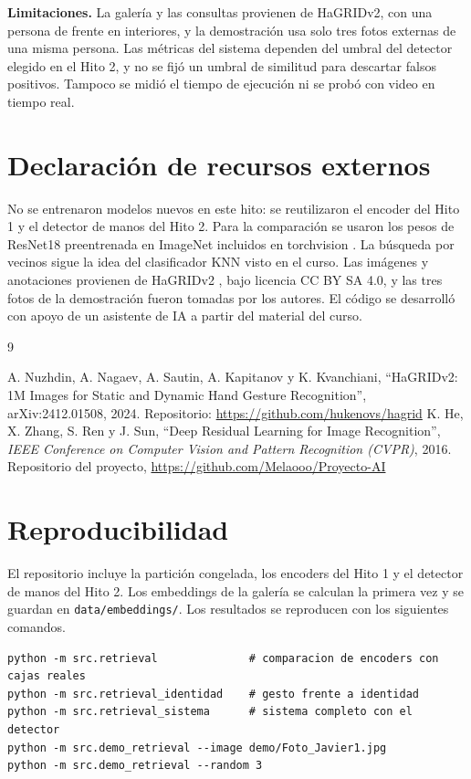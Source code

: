 \documentclass[11pt,letterpaper]{article}
\begin{document}
\textbf{Limitaciones.} La galería y las consultas provienen de HaGRIDv2, con una persona de frente en
interiores, y la demostración usa solo tres fotos externas de una misma persona. Las métricas del
sistema dependen del umbral del detector elegido en el Hito 2, y no se fijó un umbral de similitud
para descartar falsos positivos. Tampoco se midió el tiempo de ejecución ni se probó con video en
tiempo real.

\section*{Declaración de recursos externos}

No se entrenaron modelos nuevos en este hito: se reutilizaron el encoder del Hito 1 y el detector de
manos del Hito 2. Para la comparación se usaron los pesos de ResNet18 preentrenada en ImageNet
incluidos en torchvision \cite{he2016}. La búsqueda por vecinos sigue la idea del clasificador KNN
visto en el curso. Las imágenes y anotaciones provienen de HaGRIDv2 \cite{hagridv2}, bajo licencia
CC BY SA 4.0, y las tres fotos de la demostración fueron tomadas por los autores. El código se
desarrolló con apoyo de un asistente de IA a partir del material del curso.

\begin{thebibliography}{9}
 A. Nuzhdin, A. Nagaev, A. Sautin, A. Kapitanov y K. Kvanchiani, ``HaGRIDv2: 1M Images for
Static and Dynamic Hand Gesture Recognition'', arXiv:2412.01508, 2024. Repositorio:
\url{https://github.com/hukenovs/hagrid}
 K. He, X. Zhang, S. Ren y J. Sun, ``Deep Residual Learning for Image Recognition'',
\emph{IEEE Conference on Computer Vision and Pattern Recognition (CVPR)}, 2016.
 Repositorio del proyecto, \url{https://github.com/Melaooo/Proyecto-AI}
\end{thebibliography}

\newpage
\appendix
\section{Reproducibilidad}

El repositorio \cite{repo} incluye la partición congelada, los encoders del Hito 1 y el detector de
manos del Hito 2. Los embeddings de la galería se calculan la primera vez y se guardan en
\texttt{data/embeddings/}. Los resultados se reproducen con los siguientes comandos.

\begin{lstlisting}
python -m src.retrieval              # comparacion de encoders con cajas reales
python -m src.retrieval_identidad    # gesto frente a identidad
python -m src.retrieval_sistema      # sistema completo con el detector
python -m src.demo_retrieval --image demo/Foto_Javier1.jpg
python -m src.demo_retrieval --random 3
\end{lstlisting}
\end{document}
